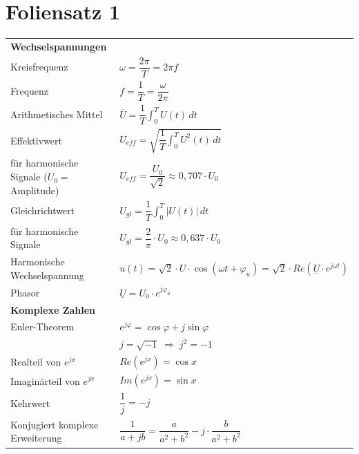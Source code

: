 \documentclass[a4paper,12pt]{scrartcl}
\begin{document}
\section{Foliensatz 1}

\begin{tabular}{@{} l l @{}}

\multicolumn{2}{l}{\textbf{Wechselspannungen}} \\
\hspace*{20mm} Kreisfrequenz & $\omega = \dfrac{2\pi}{T} = 2\pi f$ \\
\hspace*{20mm} Frequenz & $f = \dfrac{1}{T} = \dfrac{\omega}{2\pi}$ \\
\hspace*{20mm} Arithmetisches Mittel & $\overline{U} = \dfrac{1}{T}\int_0^T U(t)\,dt$ \\
\hspace*{20mm} Effektivwert & $U_{eff} = \sqrt{\dfrac{1}{T}\int_0^T U^2(t)\,dt}$ \\
\hspace*{20mm} \quad für harmonische Signale ($U_0 =$ Amplitude) & $U_{eff} = \dfrac{U_0}{\sqrt{2}} \approx 0{,}707\cdot U_0$ \\
\hspace*{20mm} Gleichrichtwert & $U_{gl} = \dfrac{1}{T}\int_0^T |U(t)|\,dt$ \\
\hspace*{20mm} \quad für harmonische Signale & $U_{gl} = \dfrac{2}{\pi}\cdot U_0 \approx 0{,}637\cdot U_0$ \\
\hspace*{20mm} Harmonische Wechselspannung & $u(t) = \sqrt{2}\cdot U\cdot\cos(\omega t + \varphi_u) = \sqrt{2}\cdot Re\!\left(\underline{U}\cdot e^{j\omega t}\right)$ \\
\hspace*{20mm} Phasor & $\underline{U} = U_0\cdot e^{j\varphi_u}$ \\[3mm]

\multicolumn{2}{l}{\textbf{Komplexe Zahlen}} \\
\hspace*{20mm} Euler-Theorem & $e^{j\varphi} = \cos\varphi + j\sin\varphi$ \\
\hspace*{20mm} & $j = \sqrt{-1} \;\Rightarrow\; j^2 = -1$ \\
\hspace*{20mm} Realteil von $e^{jx}$ & $Re\!\left(e^{jx}\right) = \cos x$ \\
\hspace*{20mm} Imaginärteil von $e^{jx}$ & $Im\!\left(e^{jx}\right) = \sin x$ \\
\hspace*{20mm} Kehrwert & $\dfrac{1}{j} = -j$ \\
\hspace*{20mm} Konjugiert komplexe Erweiterung & $\dfrac{1}{a+jb} = \dfrac{a}{a^2+b^2} - j\cdot\dfrac{b}{a^2+b^2}$ \\[3mm]


\end{tabular}
\end{document}
